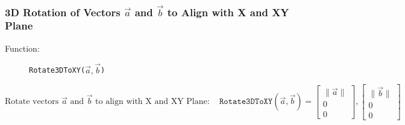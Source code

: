 \documentclass{article}
\begin{document}
\subsubsection{3D Rotation of Vectors \(\vec{a}\) and \(\vec{b}\) to Align with X and XY Plane}

\begin{description}
\item[Function:] \texttt{Rotate3DToXY(\(\vec{a}, \vec{b}\))}
\end{description}

\[
\text{Rotate vectors } \vec{a} \text{ and } \vec{b} \text{ to align with X and XY Plane} : \quad \texttt{Rotate3DToXY}(\vec{a}, \vec{b}) = \begin{bmatrix}
\| \vec{a} \| \\
0 \\
0
\end{bmatrix}, \begin{bmatrix}
\| \vec{b} \| \\
0 \\
0
\end{bmatrix}
\]
\end{document}
